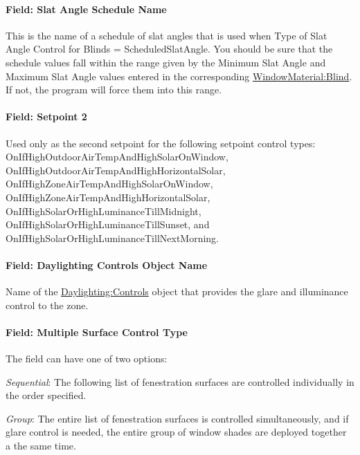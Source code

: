 \paragraph{Field: Slat Angle Schedule Name}\label{field-slat-angle-schedule-name}

This is the name of a schedule of slat angles that is used when Type of Slat Angle Control for Blinds = ScheduledSlatAngle. You should be sure that the schedule values fall within the range given by the Minimum Slat Angle and Maximum Slat Angle values entered in the corresponding \hyperref[windowmaterialblind]{WindowMaterial:Blind}. If not, the program will force them into this range.

\paragraph{Field: Setpoint 2}\label{field-setpoint-2}

Used only as the second setpoint for the following setpoint control types: OnIfHighOutdoorAirTempAndHighSolarOnWindow, OnIfHighOutdoorAirTempAndHighHorizontalSolar, OnIfHighZoneAirTempAndHighSolarOnWindow, OnIfHighZoneAirTempAndHighHorizontalSolar, OnIfHighSolarOrHighLuminanceTillMidnight, OnIfHighSolarOrHighLuminanceTillSunset, and OnIfHighSolarOrHighLuminanceTillNextMorning.

\paragraph{Field: Daylighting Controls Object Name}\label{field-daylighting-controls-object-name}

Name of the \hyperref[daylightingcontrols-000]{Daylighting:Controls} object that provides the glare and illuminance control to the zone.

\paragraph{Field: Multiple Surface Control Type}\label{field-multiple-surface-control-type}

The field can have one of two options:

\emph{Sequential}: The following list of fenestration surfaces are controlled individually in the order specified.

\emph{Group}: The entire list of fenestration surfaces is controlled simultaneously, and if glare control is needed, the entire group of window shades are deployed together a the same time.

